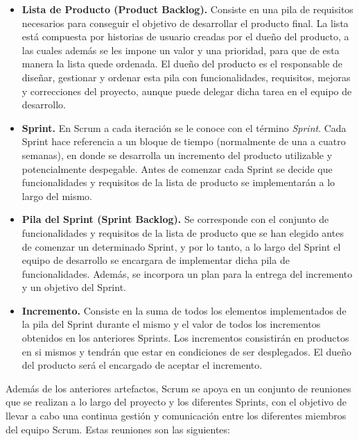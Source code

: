 
\begin{itemize}
	\item \textbf{Lista de Producto (Product Backlog).} Consiste en una pila de requisitos necesarios para conseguir el objetivo de desarrollar el producto final. La lista está compuesta por historias de usuario creadas por el dueño del producto, a las cuales además se les impone un valor y una prioridad, para que de esta manera la lista quede ordenada. El dueño del producto es el responsable de diseñar, gestionar y ordenar esta pila con funcionalidades, requisitos, mejoras y correcciones del proyecto, aunque puede delegar dicha tarea en el equipo de desarrollo.
	\item \textbf{Sprint.} En Scrum a cada iteración se le conoce con el término \emph{Sprint}. Cada Sprint hace referencia a un bloque de tiempo (normalmente de una a cuatro semanas), en donde se desarrolla un incremento del producto utilizable y potencialmente despegable. Antes de comenzar cada Sprint se decide que funcionalidades y requisitos de la lista de producto se implementarán a lo largo del mismo. 
	\item \textbf{Pila del Sprint (Sprint Backlog).} Se corresponde con el conjunto de funcionalidades y requisitos de la lista de producto que se han elegido antes de comenzar un determinado Sprint, y por lo tanto, a lo largo del Sprint el equipo de desarrollo se encargara de implementar dicha pila de funcionalidades. Además, se incorpora un plan para la entrega del incremento y un objetivo del Sprint.
	\item \textbf{Incremento.} Consiste en la suma de todos los elementos implementados de la pila del Sprint durante el mismo y el valor de todos los incrementos obtenidos en los anteriores Sprints. Los incrementos consistirán en productos en si mismos y tendrán que estar en condiciones de ser desplegados. El dueño del producto será el encargado de aceptar el incremento.
\end{itemize}

Además de los anteriores artefactos, Scrum se apoya en un conjunto de reuniones que se realizan a lo largo del proyecto y los diferentes Sprints, con el objetivo de llevar a cabo una continua gestión y comunicación entre los diferentes miembros del equipo Scrum. Estas reuniones son las siguientes:

